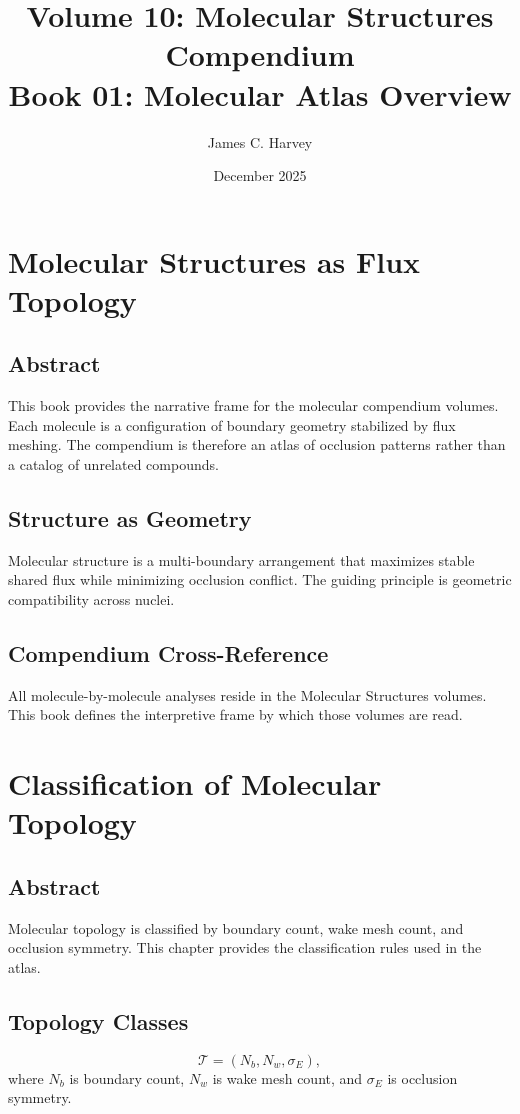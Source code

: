 \documentclass[12pt]{book}
\title{Volume 10: Molecular Structures Compendium \\ Book 01: Molecular Atlas Overview}
\author{James C. Harvey}
\date{December 2025}
\begin{document}
\maketitle
\tableofcontents

\chapter{Molecular Structures as Flux Topology}

\section*{Abstract}
This book provides the narrative frame for the molecular compendium volumes. Each molecule is a
configuration of boundary geometry stabilized by flux meshing. The compendium is therefore an atlas of
occlusion patterns rather than a catalog of unrelated compounds.

\section{Structure as Geometry}
Molecular structure is a multi-boundary arrangement that maximizes stable shared flux while minimizing
occlusion conflict. The guiding principle is geometric compatibility across nuclei.

\section{Compendium Cross-Reference}
All molecule-by-molecule analyses reside in the Molecular Structures volumes. This book defines the
interpretive frame by which those volumes are read.

\chapter{Classification of Molecular Topology}

\section*{Abstract}
Molecular topology is classified by boundary count, wake mesh count, and occlusion symmetry. This chapter
provides the classification rules used in the atlas.

\section{Topology Classes}
\begin{equation}
\mathcal{T} = (N_b, N_w, \sigma_E),
\end{equation}
where $N_b$ is boundary count, $N_w$ is wake mesh count, and $\sigma_E$ is occlusion symmetry.
\end{document}
